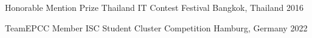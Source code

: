


\begin{cvhonors}

  \cvhonor
    {Honorable Mention Prize} %
    {Thailand IT Contest Festival} %
    {Bangkok, Thailand} %
    {2016} %
  
\end{cvhonors}


\begin{cvhonors}

    \cvhonor
      {TeamEPCC Member}
      {ISC Student Cluster Competition}
      {Hamburg, Germany}
      {2022}
  \end{cvhonors}

